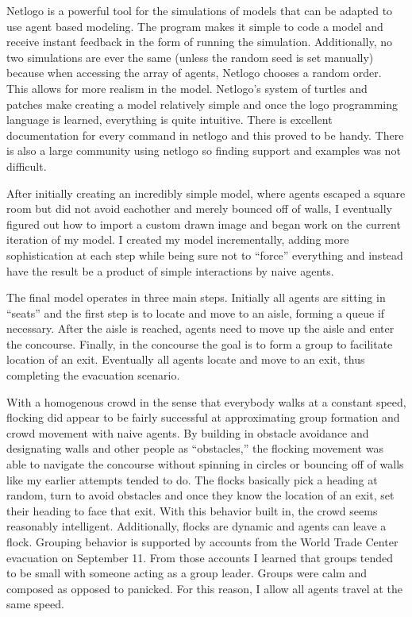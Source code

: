 \documentclass{article}
\begin{document}
Netlogo is a powerful tool for the simulations of models that can be adapted to use agent based modeling. The program makes it simple to code a model and receive instant feedback in the form of running the simulation. Additionally, no two simulations are ever the same (unless the random seed is set manually) because when accessing the array of agents, Netlogo chooses a random order. This allows for more realism in the model. Netlogo's system of turtles and patches make creating a model relatively simple and once the logo programming language is learned, everything is quite intuitive. There is excellent documentation for every command in netlogo and this proved to be handy. There is also a large community using netlogo so finding support and examples was not difficult.

After initially creating an incredibly simple model, where agents escaped a square room but did not avoid eachother and merely bounced off of walls, I eventually figured out how to import a custom drawn image and began work on the current iteration of my model. I created my model incrementally, adding more sophistication at each step while being sure not to ``force'' everything and instead have the result be a product of simple interactions by naive agents. 

The final model operates in three main steps. Initially all agents are sitting in ``seats'' and the first step is to locate and move to an aisle, forming a queue if necessary. After the aisle is reached, agents need to move up the aisle and enter the concourse. Finally, in the concourse the goal is to form a group to facilitate location of an exit. Eventually all agents locate and move to an exit, thus completing the evacuation scenario.

With a homogenous crowd in the sense that everybody walks at a
constant speed, flocking did appear to be fairly successful at
approximating group formation and crowd movement with naive agents. By
building in obstacle avoidance and designating walls and other people
as ``obstacles,'' the flocking movement was able to navigate the
concourse without spinning in circles or bouncing off of walls like my
earlier attempts tended to do. The flocks basically pick a heading at random, turn to avoid obstacles and once they know the location of an exit, set their heading to face that exit. With this behavior built in, the crowd seems reasonably intelligent. Additionally, flocks are dynamic and agents can leave a flock. Grouping behavior is supported by accounts from the World Trade Center evacuation on September 11. From those accounts I learned that groups tended to be small with someone acting as a group leader. Groups were calm and composed as opposed to panicked. For this reason, I allow  all agents travel at the same speed.
\end{document}
